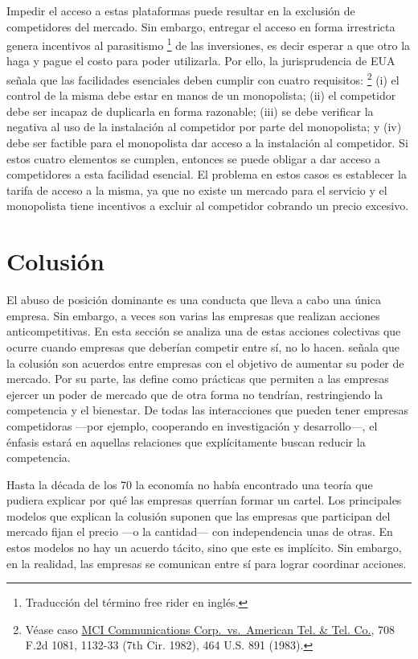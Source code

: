 \documentclass[
  12pt,
  spanish,
]{book}
\begin{document}
Impedir el acceso a estas plataformas puede resultar en la exclusión de
competidores del mercado. Sin embargo, entregar el acceso en forma
irrestricta genera incentivos al parasitismo \footnote{Traducción del
  término free rider en inglés.} de las inversiones, es decir esperar a
que otro la haga y pague el costo para poder utilizarla. Por ello, la
jurisprudencia de EUA señala que las facilidades esenciales deben
cumplir con cuatro requisitos: \footnote{Véase caso
  \href{https://law.justia.com/cases/federal/appellate-courts/F2/708/1081/330445/}{MCI
  Communications Corp.~vs.~American Tel. \& Tel. Co.}, 708 F.2d 1081,
  1132-33 (7th Cir. 1982), 464 U.S. 891 (1983).} (i) el control de la
misma debe estar en manos de un monopolista; (ii) el competidor debe ser
incapaz de duplicarla en forma razonable; (iii) se debe verificar la
negativa al uso de la instalación al competidor por parte del
monopolista; y (iv) debe ser factible para el monopolista dar acceso a
la instalación al competidor. Si estos cuatro elementos se cumplen,
entonces se puede obligar a dar acceso a competidores a esta facilidad
esencial. El problema en estos casos es establecer la tarifa de acceso a
la misma, ya que no existe un mercado para el servicio y el monopolista
tiene incentivos a excluir al competidor cobrando un precio excesivo.

\hypertarget{colusiuxf3n}{%
\section{Colusión}\label{colusiuxf3n}}

El abuso de posición dominante es una conducta que lleva a cabo una
única empresa. Sin embargo, a veces son varias las empresas que realizan
acciones anticompetitivas. En esta sección se analiza una de estas
acciones colectivas que ocurre cuando empresas que deberían competir
entre sí, no lo hacen. \citet{Cabral2017} señala que la colusión son
acuerdos entre empresas con el objetivo de aumentar su poder de mercado.
Por su parte, \citet{Motta2004} las define como prácticas que permiten a
las empresas ejercer un poder de mercado que de otra forma no tendrían,
restringiendo la competencia y el bienestar. De todas las interacciones
que pueden tener empresas competidoras ---por ejemplo, cooperando en
investigación y desarrollo---, el énfasis estará en aquellas relaciones
que explícitamente buscan reducir la competencia.

Hasta la década de los 70 la economía no había encontrado una teoría que
pudiera explicar por qué las empresas querrían formar un cartel. Los
principales modelos que explican la colusión suponen que las empresas
que participan del mercado fijan el precio ---o la cantidad--- con
independencia unas de otras. En estos modelos no hay un acuerdo tácito,
sino que este es implícito. Sin embargo, en la realidad, las empresas se
comunican entre sí para lograr coordinar acciones.
\end{document}
